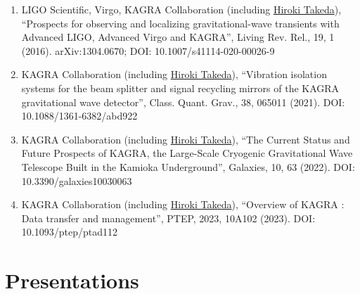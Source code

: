 \documentclass[uplatex, 12pt]{article}
\begin{document}
\begin{enumerate}
\item LIGO Scientific, Virgo, KAGRA Collaboration (including \uline{Hiroki Takeda}), “Prospects for observing and localizing gravitational-wave transients with Advanced LIGO, Advanced Virgo and KAGRA”, Living Rev. Rel., 19, 1 (2016). arXiv:1304.0670; DOI: 10.1007/s41114-020-00026-9
\item KAGRA Collaboration (including \uline{Hiroki Takeda}), “Vibration isolation systems for the beam splitter and signal recycling mirrors of the KAGRA gravitational wave detector”, Class. Quant. Grav., 38, 065011 (2021). DOI: 10.1088/1361-6382/abd922
\item KAGRA Collaboration (including \uline{Hiroki Takeda}), “The Current Status and Future Prospects of KAGRA, the Large-Scale Cryogenic Gravitational Wave Telescope Built in the Kamioka Underground”, Galaxies, 10, 63 (2022). DOI: 10.3390/galaxies10030063
\item KAGRA Collaboration (including \uline{Hiroki Takeda}), “Overview of KAGRA : Data transfer and management”, PTEP, 2023, 10A102 (2023). DOI: 10.1093/ptep/ptad112
\end{enumerate}


\section*{Presentations}
\end{document}
